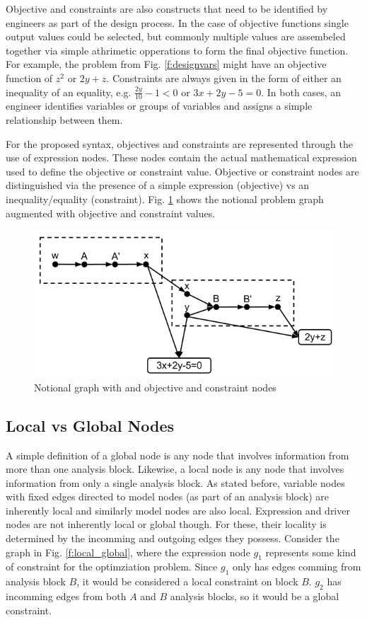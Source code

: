 Objective and constraints are also constructs that need to be identified by engineers 
as part of the design process. In the case of objective functions single output values 
could be selected, but commonly multiple values are assembeled together via simple 
athrimetic opperations to form the final objective function. For example, the problem from 
Fig. \ref{f:designvars} might have an objective function of $z^2$ or $2y + z$. Constraints are 
always given in the form of either an inequality of an equality, e.g. 
$\frac{2y}{10}-1<0$ or $3x+2y - 5=0$. In both cases, an engineer identifies variables 
or groups of variables and assigns a simple relationship between them. 

For the proposed syntax, objectives and constraints are represented through the use of 
expression nodes. These nodes contain the actual mathematical expression used to define the 
objective or constraint value. Objective or constraint nodes are distinguished
via the presence of a simple expression (objective) vs an inequality/equality (constraint). 
Fig. \ref{f:obj-cons} shows the notional problem graph augmented with objective and 
constraint values. 

\begin{figure}[htb!]
  \begin{center}
    \includegraphics[width=.6\textwidth]{images/obj_const_graph}
  \end{center}
  \caption{Notional graph with and objective and constraint nodes \label{f:obj-cons}}
\end{figure}


\subsection{Local vs Global Nodes}

  A simple definition of a global node is any node that involves information 
  from more than one analysis block. Likewise, a local node is any node 
  that involves information from only a single analysis block. As stated before, variable 
  nodes with fixed edges directed to model nodes (as part of an analysis block) are inherently local 
  and similarly model nodes are also local. Expression and driver nodes
  are not inherently local or global though. For these, their locality is determined 
  by the incomming and outgoing edges they possess. Consider the graph in Fig. \ref{f:local_global}, 
  where the expression node $g_1$ represents some kind of constraint for the optimziation problem. 
  Since $g_1$ only has edges comming from analysis block $B$, it would be considered a local constraint 
  on block $B$. $g_2$ has incomming edges from both $A$ and $B$ analysis blocks, so it would be a global constraint. 

